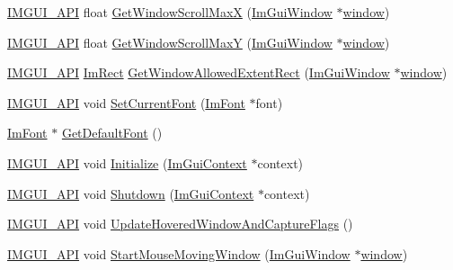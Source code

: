 \begin{DoxyCompactItemize}
\mbox{\hyperlink{imgui_8h_a43829975e84e45d1149597467a14bbf5}{I\+M\+G\+U\+I\+\_\+\+A\+PI}} float \mbox{\hyperlink{namespace_im_gui_a3675c33f4780febb0ea9801499a4b262}{Get\+Window\+Scroll\+MaxX}} (\mbox{\hyperlink{struct_im_gui_window}{Im\+Gui\+Window}} $\ast$\mbox{\hyperlink{radar_8cpp_a80de27bd7dc4e2b2ad3d5895b97a70f0}{window}})
\item 
\mbox{\hyperlink{imgui_8h_a43829975e84e45d1149597467a14bbf5}{I\+M\+G\+U\+I\+\_\+\+A\+PI}} float \mbox{\hyperlink{namespace_im_gui_a1016c33aeb30e58a7aa4a66adceed436}{Get\+Window\+Scroll\+MaxY}} (\mbox{\hyperlink{struct_im_gui_window}{Im\+Gui\+Window}} $\ast$\mbox{\hyperlink{radar_8cpp_a80de27bd7dc4e2b2ad3d5895b97a70f0}{window}})
\item 
\mbox{\hyperlink{imgui_8h_a43829975e84e45d1149597467a14bbf5}{I\+M\+G\+U\+I\+\_\+\+A\+PI}} \mbox{\hyperlink{struct_im_rect}{Im\+Rect}} \mbox{\hyperlink{namespace_im_gui_a4189cc4ec6ac56f3b21b29165d09ff98}{Get\+Window\+Allowed\+Extent\+Rect}} (\mbox{\hyperlink{struct_im_gui_window}{Im\+Gui\+Window}} $\ast$\mbox{\hyperlink{radar_8cpp_a80de27bd7dc4e2b2ad3d5895b97a70f0}{window}})
\item 
\mbox{\hyperlink{imgui_8h_a43829975e84e45d1149597467a14bbf5}{I\+M\+G\+U\+I\+\_\+\+A\+PI}} void \mbox{\hyperlink{namespace_im_gui_a4f83c0a884e07247a00700d3dd3d01e3}{Set\+Current\+Font}} (\mbox{\hyperlink{struct_im_font}{Im\+Font}} $\ast$font)
\item 
\mbox{\hyperlink{struct_im_font}{Im\+Font}} $\ast$ \mbox{\hyperlink{namespace_im_gui_a78aef54ecb95954deefaca2e850148a3}{Get\+Default\+Font}} ()
\item 
\mbox{\hyperlink{imgui_8h_a43829975e84e45d1149597467a14bbf5}{I\+M\+G\+U\+I\+\_\+\+A\+PI}} void \mbox{\hyperlink{namespace_im_gui_a2e1fd6aabbb02f367fd6aee248506782}{Initialize}} (\mbox{\hyperlink{struct_im_gui_context}{Im\+Gui\+Context}} $\ast$context)
\item 
\mbox{\hyperlink{imgui_8h_a43829975e84e45d1149597467a14bbf5}{I\+M\+G\+U\+I\+\_\+\+A\+PI}} void \mbox{\hyperlink{namespace_im_gui_ae8e2043e5d630169423e2d14a913afa1}{Shutdown}} (\mbox{\hyperlink{struct_im_gui_context}{Im\+Gui\+Context}} $\ast$context)
\item 
\mbox{\hyperlink{imgui_8h_a43829975e84e45d1149597467a14bbf5}{I\+M\+G\+U\+I\+\_\+\+A\+PI}} void \mbox{\hyperlink{namespace_im_gui_a8156f9d63c3184d40e7e303be175b5fb}{Update\+Hovered\+Window\+And\+Capture\+Flags}} ()
\item 
\mbox{\hyperlink{imgui_8h_a43829975e84e45d1149597467a14bbf5}{I\+M\+G\+U\+I\+\_\+\+A\+PI}} void \mbox{\hyperlink{namespace_im_gui_afd03199380411a711c74893434d91258}{Start\+Mouse\+Moving\+Window}} (\mbox{\hyperlink{struct_im_gui_window}{Im\+Gui\+Window}} $\ast$\mbox{\hyperlink{radar_8cpp_a80de27bd7dc4e2b2ad3d5895b97a70f0}{window}})

\end{DoxyCompactItemize}
